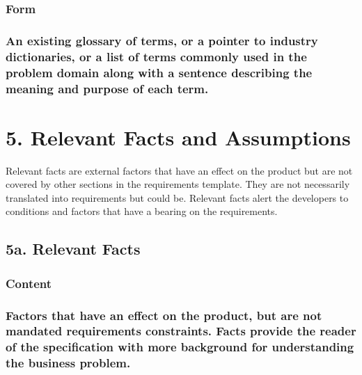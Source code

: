\documentclass[
]{article}
\begin{document}
\hypertarget{form-17}{%
\subsubsection{Form}\label{form-17}}

\hypertarget{an-existing-glossary-of-terms-or-a-pointer-to-industry-dictionaries-or-a-list-of-terms-commonly-used-in-the-problem-domain-along-with-a-sentence-describing-the-meaning-and-purpose-of-each-term.}{%
\subsubsection{An existing glossary of terms, or a pointer to industry
dictionaries, or a list of terms commonly used in the problem domain
along with a sentence describing the meaning and purpose of each
term.}\label{an-existing-glossary-of-terms-or-a-pointer-to-industry-dictionaries-or-a-list-of-terms-commonly-used-in-the-problem-domain-along-with-a-sentence-describing-the-meaning-and-purpose-of-each-term.}}

\hypertarget{relevant-facts-and-assumptions}{%
\section{5. Relevant Facts and
Assumptions}\label{relevant-facts-and-assumptions}}

Relevant facts are external factors that have an effect on the product
but are not covered by other sections in the requirements template. They
are not necessarily translated into requirements but could be. Relevant
facts alert the developers to conditions and factors that have a bearing
on the requirements.

\hypertarget{a.-relevant-facts}{%
\subsection{5a. Relevant Facts}\label{a.-relevant-facts}}

\hypertarget{content-19}{%
\subsubsection{Content}\label{content-19}}

\hypertarget{factors-that-have-an-effect-on-the-product-but-are-not-mandated-requirements-constraints.-facts-provide-the-reader-of-the-specification-with-more-background-for-understanding-the-business-problem.}{%
\subsubsection{\texorpdfstring{Factors that have an effect on the
product, but are not mandated requirements constraints. Facts provide
the reader of the specification with more background for understanding
the business problem.
}{Factors that have an effect on the product, but are not mandated requirements constraints. Facts provide the reader of the specification with more background for understanding the business problem. }}\label{factors-that-have-an-effect-on-the-product-but-are-not-mandated-requirements-constraints.-facts-provide-the-reader-of-the-specification-with-more-background-for-understanding-the-business-problem.}}
\end{document}
